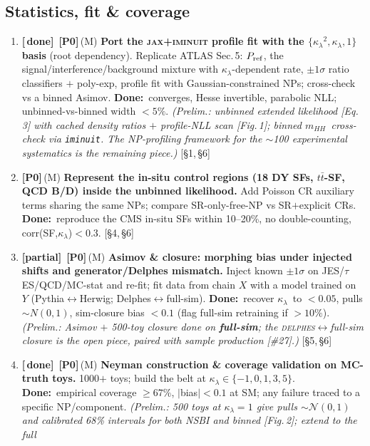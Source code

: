 \documentclass[11pt]{article}
\newcommand{\kl}{\ensuremath{\kappa_\lambda}}
\newcommand{\mhh}{\ensuremath{m_{HH}}}
\newcommand{\priZ}{\textcolor{red!75!black}{\textbf{[P0]}}}
\newcommand{\eff}[1]{{\footnotesize\textcolor{gray!65!black}{(#1)}}}
\newcommand{\sref}[1]{ {\footnotesize\textcolor{gray!60!black}{[#1]}}}
\newcommand{\dw}{\textcolor{green!30!black}{\textbf{Done:}}~}
\newcommand{\stDone}{\textcolor{green!50!black}{\textbf{[\checkmark\,done]}}}
\newcommand{\stPart}{\textcolor{orange!90!black}{\textbf{[partial]}}}
\begin{document}
\subsection*{Statistics, fit \& coverage}
\begin{enumerate}[resume,leftmargin=2.6em]\small
\item \stDone\ \priZ\,\eff{M} \textbf{Port the \textsc{jax}+\textsc{iminuit} profile fit with the
$\{$\kl$^2,$\kl$,1\}$ basis} (root dependency). Replicate ATLAS Sec.\,5: $P_{\rm ref}$, the
signal/interference/background mixture with \kl-dependent rate, $\pm1\sigma$ ratio classifiers $+$ poly-exp, profile
fit with Gaussian-constrained NPs; cross-check vs a binned Asimov. \dw converges, Hesse invertible, parabolic NLL;
unbinned-vs-binned width $<5\%$. \textcolor{green!45!black}{\emph{\small(Prelim.: unbinned extended likelihood
[Eq.\,3] with cached density ratios $+$ profile-NLL scan [Fig.\,1]; binned \mhh\ cross-check via \texttt{iminuit}.
The NP-profiling framework for the $\sim$100 experimental systematics is the remaining piece.)}} \sref{\S1,\,\S6}
\item \priZ\,\eff{M} \textbf{Represent the in-situ control regions (18 DY SFs, $t\bar t$-SF, QCD B/D) inside the
unbinned likelihood.} Add Poisson CR auxiliary terms sharing the same NPs; compare SR-only-free-NP vs SR$+$explicit
CRs. \dw reproduce the CMS in-situ SFs within 10--20\%, no double-counting, corr(SF,\kl)$<0.3$. \sref{\S4,\,\S6}
\item \stPart\ \priZ\,\eff{M} \textbf{Asimov \& closure: morphing bias under injected shifts and generator/Delphes
mismatch.} Inject known $\pm1\sigma$ on JES/$\tau$ES/QCD/MC-stat and re-fit; fit data from chain $X$ with a model
trained on $Y$ (Pythia$\leftrightarrow$Herwig; Delphes$\leftrightarrow$full-sim). \dw recover \kl\ to $<0.05$, pulls
$\sim N(0,1)$, sim-closure bias $<0.1$ (flag full-sim retraining if $>10\%$). \textcolor{orange!75!black}{\emph{\small(Prelim.:
Asimov $+$ 500-toy closure done on \textbf{full-sim}; the \textsc{delphes}$\leftrightarrow$full-sim closure is the open
piece, paired with sample production [\#27].)}} \sref{\S5,\,\S6}
\item \stDone\ \priZ\,\eff{M} \textbf{Neyman construction \& coverage validation on MC-truth toys.} 1000$+$ toys; build the
belt at \kl$\in\{-1,0,1,3,5\}$. \dw empirical coverage $\ge67\%$, $|$bias$|<0.1$ at SM; any failure traced to a
specific NP/component. \textcolor{green!45!black}{\emph{\small(Prelim.: 500 toys at \kl$=1$ give pulls
$\sim\mathcal N(0,1)$ and calibrated 68\% intervals for both NSBI and binned [Fig.\,2]; extend to the full
}}
\end{enumerate}
\end{document}
